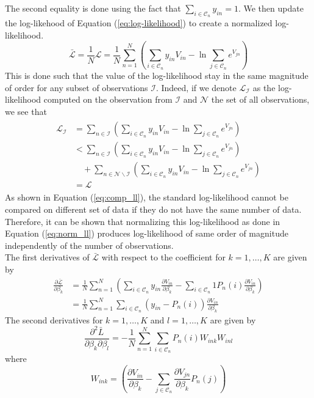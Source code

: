 \documentclass[conference]{IEEEtran}
\begin{document}
The second equality is done using the fact that $\sum_{i\in\mathcal{C}_n} y_{in} = 1$. We then update the log-likehood of Equation (\ref{eq:log-likelihood}) to create a normalized log-likelihood.
\begin{equation}
\label{eq:norm_ll}
\bar{\mathcal{L}} = \frac{1}{N}\mathcal{L} = \frac{1}{N} \sum_{n=1}^N \left( \sum_{i\in\mathcal{C}_n} y_{in}V_{in} - \ln \sum_{j\in\mathcal{C}_n}e^{V_{jn}} \right)
\end{equation}
This is done such that the value of the log-likelihood stay in the same magnitude of order for any subset of observations $\mathcal{I}$. Indeed, if we denote $\mathcal{L}_{\mathcal{I}}$ as the log-likelihood computed on the observation from $\mathcal{I}$ and $\mathcal{N}$ the set of all observations, we see that
\begin{align}
\label{eq:comp_ll}
\begin{split}
\mathcal{L}_{\mathcal{I}} &=  \sum_{n\in \mathcal{I}} \left( \sum_{i\in\mathcal{C}_n} y_{in}V_{in} - \ln \sum_{j\in\mathcal{C}_n}e^{V_{jn}} \right)  \\
&< \sum_{n\in \mathcal{I}} \left( \sum_{i\in\mathcal{C}_n} y_{in}V_{in} - \ln \sum_{j\in\mathcal{C}_n}e^{V_{jn}} \right) \\ &\quad + \sum_{n \in \mathcal{N} \smallsetminus \mathcal{I}} \left( \sum_{i\in\mathcal{C}_n} y_{in}V_{in} - \ln \sum_{j\in\mathcal{C}_n}e^{V_{jn}} \right) \\
&= \mathcal{L}
\end{split}
\end{align}
As shown in Equation (\ref{eq:comp_ll}), the standard log-likelihood cannot be compared on different set of data if they do not have the same number of data. Therefore, it can be shown that normalizing this log-likelihood as done in Equation (\ref{eq:norm_ll}) produces log-likelihood of same order of magnitude independently of the number of observations.\\

The first derivatives of $\bar{\mathcal{L}}$ with respect to the coefficient for $k=1,\ldots,K$ are given by
\begin{align}
\frac{\partial \bar{\mathcal{L}}}{\partial \beta_k} &= \frac{1}{N} \sum_{n=1}^N \left(\sum_{i\in\mathcal{C}_n} y_{in}\frac{\partial V_{in}}{\partial \beta_k} - \sum_{i\in\mathcal{C}_n}1 P_n(i) \frac{\partial V_{in}}{\partial \beta_k}\right) \nonumber \\
&= \frac{1}{N}\sum_{n=1}^N \sum_{i\in\mathcal{C}_n} \left(y_{in} - P_n(i)\right) \frac{\partial V_{in}}{\partial \beta_k} 
\end{align}
The second derivatives for $k=1,\ldots,K$ and $l=1,\ldots,K$ are given by
\begin{equation}
\label{eq:second_deriv}
\frac{\partial^2 \bar{L}}{\partial \beta_k \partial \beta_l} = - \frac{1}{N}\sum_{n=1}^N \sum_{i\in\mathcal{C}_n} P_n(i) W_{ink} W_{inl}
\end{equation}
where 
\[
W_{ink} = \left(\frac{\partial V_{in}}{\partial \beta_k} - \sum_{j\in\mathcal{C}_n} \frac{\partial V_{jn}}{\partial \beta_k}P_n(j)\right)
\]
\end{document}
